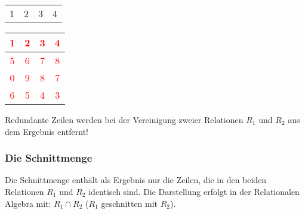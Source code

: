 \begin{center}
\begin{small}
\begin{minipage}[b]{.2\linewidth}
\begin{center}
\begin{supertabular}{|c|c|c|c|}
                     & 2 & 3 & 4  \\
                  \end{supertabular}
                \end{center}
              \end{minipage}
              \hfil
              \begin{minipage}[b]{.2\linewidth}
                \begin{center}
                  \tabletail{
                    \hline
                  }
                  \tablelasttail{
                    \hline
                  }
                  \begin{supertabular}{|c|c|c|c|}
                    \textcolor{red}{1} & \textcolor{red}{2} & \textcolor{red}{3} & \textcolor{red}{4} \\
                    \hline
                    \textcolor{red}{5} & \textcolor{red}{6} & \textcolor{red}{7} & \textcolor{red}{8} \\
                    \hline
                    \textcolor{red}{0} & \textcolor{red}{9} & \textcolor{red}{8} & \textcolor{red}{7} \\
                    \hline
                    \textcolor{red}{6} & \textcolor{red}{5} & \textcolor{red}{4} & \textcolor{red}{3} \\
                  \end{supertabular}
                \end{center}
              \end{minipage}
            \end{small}
          \end{center}
          \begin{merke}
            Redundante Zeilen werden bei der Vereinigung zweier Relationen $R_1$ und $R_2$ aus dem Ergebnis entfernt!
          \end{merke}
        \subsubsection{Die Schnittmenge}
          Die Schnittmenge enth\"alt als Ergebnis nur die Zeilen, die in den beiden Relationen $R_1$ und $R_2$ identisch sind. Die Darstellung erfolgt in der Relationalen Algebra mit: $R_1\cap R_2$ ($R_1$ geschnitten mit $R_2$).


